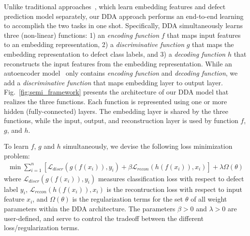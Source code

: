 Unlike traditional approaches~\cite{yang2015deep, wang2016automatically}, which learn embedding features and defect prediction model separately, our DDA approach performs an end-to-end learning to accomplish the two tasks in one shot. Specifically, DDA simultaneously learns three (non-linear) functions: 1) an \emph{encoding function} $f$ that maps input features to an embedding representation, 2) a \emph{discriminative function} $g$ that maps the embedding representation to defect class labels, and 3) a \emph{decoding function} $h$ that reconstructs the input features from the embedding representation. {While an autoencoder model~\cite{Vincent2010} only contains \emph{encoding function} and \emph{decoding function}, we add a  \emph{discriminative function} that maps embedding layer to output layer. %
Fig.~\ref{fig:semi_framework} presents the architecture of our DDA model that realizes the three functions. Each function is represented using one or more hidden (fully-connected) layers. The embedding layer is shared by the three functions, while the input, output, and reconstruction layer is used by function $f$, $g$, and $h$.} 


To learn $f$, $g$ and $h$ simultaneously, we devise the following loss minimization problem:
\begin{align}
\label{eq:loss}
\min \sum_{i=1}^{n} \left[ \mathcal{L}_{discr}(g(f(x_i)), y_i) + \beta \mathcal{L}_{recon}(h(f(x_i)), x_i) \right] + \lambda \Omega(\theta)
\end{align}
where $\mathcal{L}_{discr}(g(f(x_i)), y_i)$ measures classification loss with respect to defect label $y_i$, $\mathcal{L}_{recon}(h(f(x_i)), x_i)$ is the recontruction loss with respect to input feature $x_i$, and $\Omega(\theta)$ is the regularization terms for the set $\theta$ of all weight parameters within the DDA architecture. The parameters $\beta > 0$ and $\lambda > 0$ are user-defined, and serve to control the tradeoff between the different loss/regularization terms.

